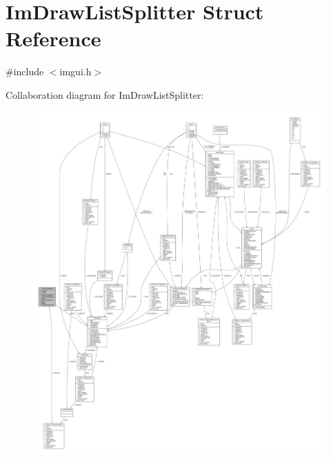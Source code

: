 \hypertarget{structImDrawListSplitter}{}\section{Im\+Draw\+List\+Splitter Struct Reference}
\label{structImDrawListSplitter}


{\ttfamily \#include $<$imgui.\+h$>$}



Collaboration diagram for Im\+Draw\+List\+Splitter\+:
\nopagebreak
\begin{figure}[H]
\begin{center}
\leavevmode
\includegraphics[width=350pt]{structImDrawListSplitter__coll__graph}
\end{center}
\end{figure}

